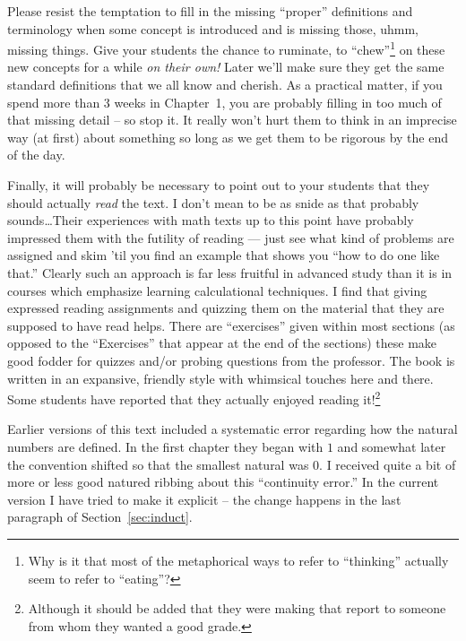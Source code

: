 Please resist the temptation to fill in the missing ``proper'' 
definitions and terminology when some concept is introduced and
is missing those, uhmm, missing things.  Give your students the
chance to ruminate, to ``chew''\footnote{Why is it that most %
of the metaphorical ways to refer to ``thinking'' actually seem %
to refer to ``eating''?} on these new concepts for a while
{\em on their own!}  Later we'll make sure they get the same 
standard definitions that we all know and cherish.  As a practical
matter, if you spend more than 3 weeks in Chapter~1, you are 
probably filling in too much of that missing detail -- so stop it.
It really won't hurt them to think in an imprecise way (at first)
about something so long as we get them to be rigorous by the 
end of the day.   

Finally, it will probably be necessary to point out to your
students that they should actually {\em read} the text.  I
don't mean to be as snide as that probably sounds\ldots  Their
experiences with math texts up to this point have probably impressed
them with the futility of reading --- just see what kind of problems
are assigned and skim 'til you find an example that shows you ``how
to do one like that.''  Clearly such an approach is far less fruitful
in advanced study than it is in courses which emphasize learning
calculational techniques.  I find that giving expressed reading 
assignments and quizzing them on the material that they are supposed
to have read helps.  There are ``exercises'' given within most 
sections (as opposed to the ``Exercises'' that appear at the end
of the sections) these make good fodder for quizzes and/or probing 
questions from the professor.  The book is written in an expansive,
friendly style with whimsical touches here and there.  Some students
have reported that they actually enjoyed reading it!\footnote{Although %
it should be added that they were making that report to someone %
from whom they wanted a good grade.}
  
Earlier versions of this text included a systematic error regarding how
the natural numbers are defined.  In the first chapter they began with $1$
and somewhat later the convention shifted so that the smallest natural 
was $0$.  I received quite a bit of more or less good natured ribbing 
about this ``continuity error.''  In the current version I have tried to make it explicit -- the 
change happens in the last paragraph of Section~\ref{sec:induct}.  

 
